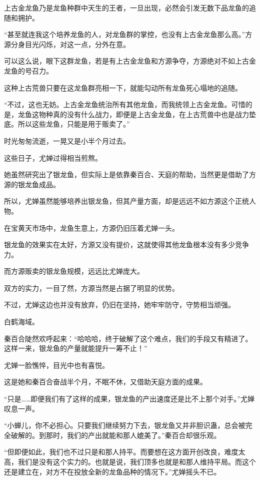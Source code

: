 \begin{this_body}
上古金龙鱼乃是龙鱼种群中天生的王者，一旦出现，必然会引发无数下品龙鱼的追随和拥护。

“甚至就连我这个培养龙鱼的人，对龙鱼群的掌控，也没有上古金龙鱼那么高。”方源分身目光闪烁，对这一点，分外在意。

可以这么说，眼下这群龙鱼，若是有上古金龙鱼和方源争夺，方源绝对不如上古金龙鱼的号召力。

这种上古荒兽只要在这龙鱼群亮相一下，就能勾动所有龙鱼死心塌地的追随。

“不过，这也无妨。上古金龙鱼统治所有其他龙鱼，而我统领上古金龙鱼。可惜的是，龙鱼这物种真的没有什么战力，即便是上古金龙鱼，在上古荒兽中也是战力垫底。所以这些龙鱼，只能是用于贩卖了。”

时光匆匆流逝，一晃又是小半个月过去。

这些日子，尤婵过得相当煎熬。

她虽然研究出了银龙鱼，但实际上是依靠秦百合、天庭的帮助，当然更是借助了方源的银龙鱼成品。

所以，尤婵虽然能够培养出银龙鱼，但其产量方面，却是远远不如方源这个正统人物。

在宝黄天市场中，龙鱼生意上，方源仍旧压着尤婵一头。

银龙鱼的效果实在太好，方源又没有提价，这就使得其他龙鱼根本没有多少竞争力。

而方源贩卖的银龙鱼规模，远远比尤婵庞大。

双方的实力，一目了然，方源当然是占据了明显的优势。

不过，尤婵这边也并没有放弃，仍旧在坚持，她牢牢防守，守势相当顽强。

白鹤海域。

秦百合陡然欢呼起来：“哈哈哈，终于破解了这个难点，我们的手段又有精进了。这样一来，银龙鱼的产量就能提升一筹不止！”

尤婵一脸憔悴，目光中也有喜悦。

这是她和秦百合奋战半个月，不眠不休，又借助天庭方面的成果。

“只是……即便我们有了这样的成果，银龙鱼的产出速度还是比不上那个对手。”尤婵叹息一声。

“小蝉儿，你不必担心。只要我们继续努力下去，银龙鱼又并非胆识蛊，总会被完全破解的。到那时，我们的产出就能和那人媲美了。”秦百合却很乐观。

“但即便如此，我们也不过只是和那人持平。而要想在这方面开创改良，难度太高，我们是没有这个实力的。也就是说，我们顶多也就是和那人维持平局。而这个还是建立在，对方不在投放全新的龙鱼品种的情况下。”尤婵摇头不已。


\end{this_body}

